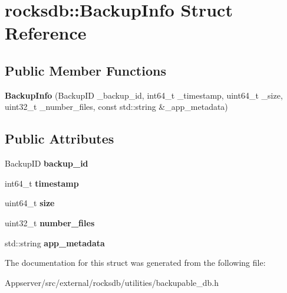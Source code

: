\hypertarget{structrocksdb_1_1BackupInfo}{}\section{rocksdb\+:\+:Backup\+Info Struct Reference}
\label{structrocksdb_1_1BackupInfo}
\subsection*{Public Member Functions}
\begin{DoxyCompactItemize}
\item 
{\bfseries Backup\+Info} (Backup\+ID \+\_\+backup\+\_\+id, int64\+\_\+t \+\_\+timestamp, uint64\+\_\+t \+\_\+size, uint32\+\_\+t \+\_\+number\+\_\+files, const std\+::string \&\+\_\+app\+\_\+metadata)\hypertarget{structrocksdb_1_1BackupInfo_ae219e77d7a82852aae22f996af0a598e}{}\label{structrocksdb_1_1BackupInfo_ae219e77d7a82852aae22f996af0a598e}

\end{DoxyCompactItemize}
\subsection*{Public Attributes}
\begin{DoxyCompactItemize}
\item 
Backup\+ID {\bfseries backup\+\_\+id}\hypertarget{structrocksdb_1_1BackupInfo_ac694e575124d8da4e812979e1a7b7b17}{}\label{structrocksdb_1_1BackupInfo_ac694e575124d8da4e812979e1a7b7b17}

\item 
int64\+\_\+t {\bfseries timestamp}\hypertarget{structrocksdb_1_1BackupInfo_ab3b8e1719982fa30f57917e3d88896d9}{}\label{structrocksdb_1_1BackupInfo_ab3b8e1719982fa30f57917e3d88896d9}

\item 
uint64\+\_\+t {\bfseries size}\hypertarget{structrocksdb_1_1BackupInfo_a9e66561a83e7a131f501466b50cc40b0}{}\label{structrocksdb_1_1BackupInfo_a9e66561a83e7a131f501466b50cc40b0}

\item 
uint32\+\_\+t {\bfseries number\+\_\+files}\hypertarget{structrocksdb_1_1BackupInfo_a9c5878d45ea51109574bad353b984034}{}\label{structrocksdb_1_1BackupInfo_a9c5878d45ea51109574bad353b984034}

\item 
std\+::string {\bfseries app\+\_\+metadata}\hypertarget{structrocksdb_1_1BackupInfo_a56eeb6089379c3b71e59044fe7679167}{}\label{structrocksdb_1_1BackupInfo_a56eeb6089379c3b71e59044fe7679167}

\end{DoxyCompactItemize}


The documentation for this struct was generated from the following file\+:\begin{DoxyCompactItemize}
\item 
Appserver/src/external/rocksdb/utilities/backupable\+\_\+db.\+h\end{DoxyCompactItemize}
